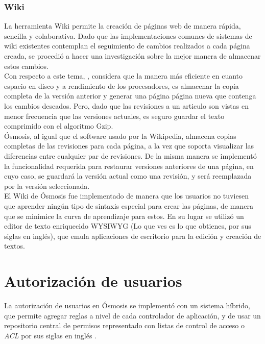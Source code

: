 \subsubsection{Wiki}
La herramienta Wiki permite la creación de páginas web de manera rápida, sencilla y colaborativa. Dado que las implementaciones comunes de sistemas de wiki existentes contemplan el seguimiento de cambios realizados a cada página creada, se procedió a hacer una investigación sobre la mejor manera de almacenar estos cambios.\\

Con respecto a este tema, \citep{Starling2004}, considera que la manera más eficiente en cuanto espacio en disco y a rendimiento de los procesadores, es almacenar la copia completa de la versión anterior y generar una página página nueva que contenga los cambios deseados. Pero, dado que las revisiones a un articulo son vistas en menor frecuencia que las versiones actuales, es seguro guardar el texto comprimido con el algoritmo Gzip.\\

Ósmosis, al igual que el software usado por la Wikipedia, almacena copias completas de las revisiones para cada página, a la vez que soporta visualizar las diferencias entre cualquier par de revisiones. De la misma manera se implementó la funcionalidad requerida para restaurar versiones anteriores de una página, en cuyo caso, se guardará la versión actual como una revisión, y será reemplazada por la versión seleccionada.\\

El Wiki de Ósmosis fue implementado de manera que los usuarios no tuviesen que aprender ningún tipo de sintaxis especial para crear las páginas, de manera que se minimice la curva de aprendizaje para estos. En su lugar se utilizó un editor de texto enriquecido WYSIWYG (Lo que ves es lo que obtienes, por sus siglas en inglés), que emula aplicaciones de escritorio para la edición y creación de textos.

\section{Autorización de usuarios}
La autorización de usuarios en Ósmosis se implementó con un sistema híbrido, que permite agregar reglas a nivel de cada controlador de aplicación, y de usar un repositorio central de permisos representado con listas de control de acceso o \emph{ACL} por sus siglas en inglés \citep{ACLWikipedia}.\\

